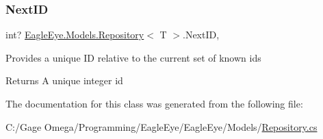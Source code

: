 \subsubsection{\texorpdfstring{NextID}{NextID}}
{\footnotesize\ttfamily int? \mbox{\hyperlink{class_eagle_eye_1_1_models_1_1_repository}{Eagle\+Eye.\+Models.\+Repository}}$<$ T $>$.Next\+ID\hspace{0.3cm}{\ttfamily [static]}, {\ttfamily [get]}}



Provides a unique ID relative to the current set of known ids 

\begin{DoxyReturn}{Returns}
A unique integer id 
\end{DoxyReturn}


The documentation for this class was generated from the following file\+:\begin{DoxyCompactItemize}
\item 
C\+:/\+Gage Omega/\+Programming/\+Eagle\+Eye/\+Eagle\+Eye/\+Models/\mbox{\hyperlink{_repository_8cs}{Repository.\+cs}}\end{DoxyCompactItemize}
